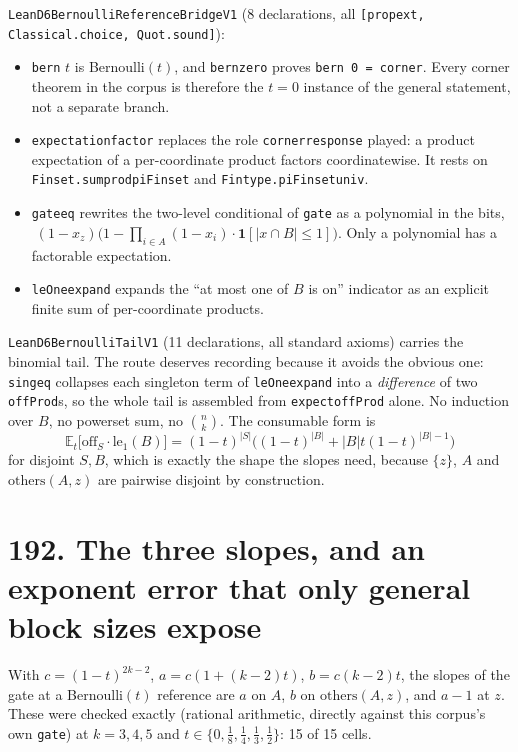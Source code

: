 \documentclass[9pt,twocolumn]{article}
\renewcommand{\_}{\CIGunderscore\allowbreak}
\begin{document}
\texttt{LeanD6BernoulliReferenceBridgeV1} (8 declarations, all \texttt{[propext, Classical.choice, Quot.sound]}):
\begin{itemize}
\item \texttt{bern} $t$ is Bernoulli$(t)$, and \texttt{bern\_zero} proves \texttt{bern 0 = corner}. Every corner theorem in the corpus is therefore the $t=0$ instance of the general statement, not a separate branch.
\item \texttt{expectation\_factor} replaces the role \texttt{corner\_response} played: a product expectation of a per-coordinate product factors coordinatewise. It rests on \texttt{Finset.sum\_prod\_piFinset} and \texttt{Fintype.piFinset\_univ}.
\item \texttt{gate\_eq} rewrites the two-level conditional of \texttt{gate} as a polynomial in the bits, $\;(1-x_z)\big(1-\prod_{i\in A}(1-x_i)\cdot\mathbf{1}[|x\cap B|\le 1]\big)$. Only a polynomial has a factorable expectation.
\item \texttt{leOne\_expand} expands the ``at most one of $B$ is on'' indicator as an explicit finite sum of per-coordinate products.
\end{itemize}

\texttt{LeanD6BernoulliTailV1} (11 declarations, all standard axioms) carries the binomial tail. The route deserves recording because it avoids the obvious one: \texttt{sing\_eq} collapses each singleton term of \texttt{leOne\_expand} into a \emph{difference} of two \texttt{offProd}s, so the whole tail is assembled from \texttt{expect\_offProd} alone. No induction over $B$, no powerset sum, no $\binom{n}{k}$. The consumable form is
\[ \mathbb{E}_t\big[\mathrm{off}_S\cdot\mathrm{le}_1(B)\big]=(1-t)^{|S|}\Big((1-t)^{|B|}+|B|t(1-t)^{|B|-1}\Big) \]
for disjoint $S,B$, which is exactly the shape the slopes need, because $\{z\}$, $A$ and $\mathrm{others}(A,z)$ are pairwise disjoint by construction.

\section*{192. The three slopes, and an exponent error that only general block sizes expose}

With $c=(1-t)^{2k-2}$, $a=c(1+(k-2)t)$, $b=c(k-2)t$, the slopes of the gate at a Bernoulli$(t)$ reference are $a$ on $A$, $b$ on $\mathrm{others}(A,z)$, and $a-1$ at $z$. These were checked exactly (rational arithmetic, directly against this corpus's own \texttt{gate}) at $k=3,4,5$ and $t\in\{0,\tfrac18,\tfrac14,\tfrac13,\tfrac12\}$: 15 of 15 cells.
\end{document}
